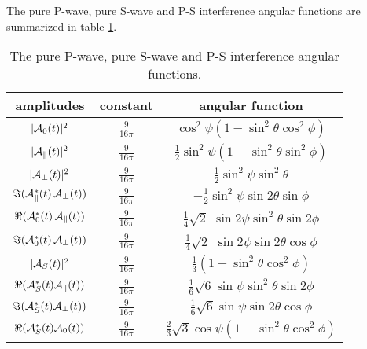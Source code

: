 \documentclass[a4paper,9pt,twosided]{article}
\begin{document}
The pure P-wave, pure S-wave and P-S interference angular functions are summarized in table \ref{tab:canonicalpdf}.
\begin{table}[htb]
  \begin{center}
    \renewcommand{\arraystretch}{1.5}
    \begin{tabular}{|c|c|c|}
      \hline
      amplitudes & constant & angular function \\
      \hline
      \hline
      $|{\cal{A}}_{0}(t)|^2$ & $\frac{9}{16 \pi}$
        &  $\cos^2\psi \left(1 - \sin^2\theta \cos^2\phi\right)$  \\
      $|{\cal{A}}_{\parallel}(t)|^2$ & $\frac{9}{16 \pi}$
        &  $\frac{1}{2}\sin^2\psi \left(1 - \sin^2\theta \sin^2\phi\right)$  \\
      $|{\cal{A}}_{\perp}(t)|^2$ & $\frac{9}{16 \pi}$
        &  $\frac{1}{2}\sin^2\psi \sin^2\theta$  \\
      $\Im({\cal{A}}_{\parallel}^{*}(t)\,{\cal{A}}_{\perp}(t))$ & $\frac{9}{16 \pi}$
        &  $-\frac{1}{2}\sin^2\psi \sin2\theta \sin\phi$  \\
      $\Re({\cal{A}}_{0}^{*}(t)\,{\cal{A}}_{\parallel}(t))$ & $\frac{9}{16 \pi}$
        &   $\frac{1}{4}\sqrt{2}$ $\sin2\psi \sin^2\theta \sin2\phi$  \\
      $\Im({\cal{A}}_{0}^{*}(t)\,{\cal{A}}_{\perp}(t))$ & $\frac{9}{16 \pi}$
        &  $\frac{1}{4}\sqrt{2}$ $\sin2\psi \sin2\theta \cos\phi$  \\
      $|{\cal{A}}_S(t)|^2$ & $\frac{9}{16 \pi}$                     
      & $\frac{1}{3} (1-\sin^2\theta\cos^2\phi)$  \\
      $\Re({\cal{A}}_S^*(t){\cal{A}}_\parallel(t))$ & $\frac{9}{16 \pi} $
      &  $\frac{1}{6}\sqrt{6}\sin\psi\sin^2\theta\sin 2\phi$ \\
      $\Im({\cal{A}}_S^*(t){\cal{A}}_\perp(t))$ & $\frac{9}{16 \pi}$ 
      &  $\frac{1}{6}\sqrt{6}\sin\psi\sin2\theta\cos\phi$ \\
      $ \Re({\cal{A}}_S^*(t){\cal{A}}_0(t)) $ & $\frac{9}{16 \pi} $
      & $\frac{2}{3}\sqrt{3}\cos\psi(1-\sin^2\theta\cos^2\phi)$ \\
       \hline
    \end{tabular}
  \end{center}
  \caption{The pure P-wave, pure S-wave and P-S interference angular functions.}\label{tab:canonicalpdf}
\end{table}
\end{document}
